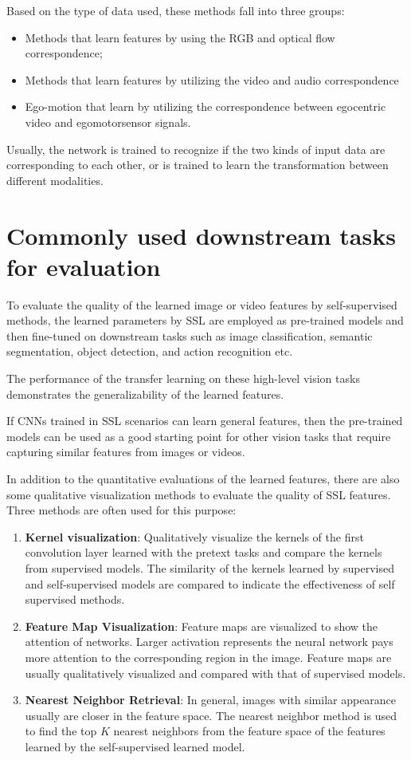 Based on the type of data used, these methods fall into three groups:
\begin{itemize}
      \item Methods that learn features by using the RGB and optical flow
            correspondence;
      \item Methods that learn features by utilizing the video and audio correspondence
      \item Ego-motion that learn by utilizing the correspondence between egocentric
            video and egomotorsensor signals.
\end{itemize}

Usually, the network is trained to recognize if the two kinds of input data are
corresponding to each other, or is trained to learn the transformation between
different modalities.
\section{Commonly used downstream tasks for evaluation}
To evaluate the quality of the learned image or video features by self-supervised
methods, the learned parameters by SSL are employed as pre-trained models and then
fine-tuned on downstream tasks such as image classification, semantic segmentation,
object detection, and action recognition etc.

The performance of the transfer learning on these high-level vision tasks
demonstrates the generalizability of the learned features.

If CNNs trained in SSL scenarios can learn general features, then the pre-trained
models can be used as a good starting point for other vision tasks that require
capturing similar features from images or videos.

In addition to the quantitative evaluations of the learned features, there are
also some qualitative visualization methods to evaluate the quality of SSL features.
Three methods are often used for this purpose:
\begin{enumerate}
      \item \textbf{Kernel visualization}: Qualitatively visualize the kernels of
            the first convolution layer learned with the pretext tasks and compare
            the kernels from supervised models. The similarity of the kernels
            learned by supervised and self-supervised models are compared to
            indicate the effectiveness of self supervised methods.
      \item \textbf{Feature Map Visualization}: Feature maps are visualized to
            show the attention of networks. Larger activation represents the neural
            network pays more attention to the corresponding region in the image.
            Feature maps are usually qualitatively visualized and compared with
            that of supervised models.
      \item \textbf{Nearest Neighbor Retrieval}: In general, images with similar
            appearance usually are closer in the feature space. The nearest
            neighbor method is used to find the top $K$ nearest neighbors from
            the feature space of the features learned by the self-supervised
            learned model.
\end{enumerate}